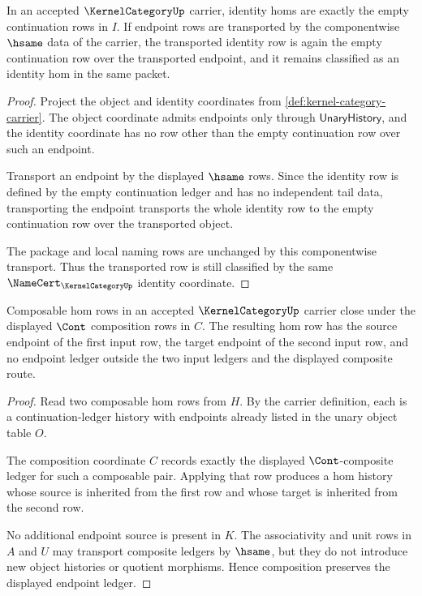 \begin{theorem}
\label{thm:kernel-category-identity-continuation}
In an accepted $\KernelCategoryUp$ carrier, identity homs are exactly the empty continuation rows in $I$. If endpoint rows are transported by the componentwise $\hsame$ data of the carrier, the transported identity row is again the empty continuation row over the transported endpoint, and it remains classified as an identity hom in the same packet.
\end{theorem}
\begin{proof}
Project the object and identity coordinates from \autoref{def:kernel-category-carrier}. The object coordinate admits endpoints only through $\mathsf{UnaryHistory}$, and the identity coordinate has no row other than the empty continuation row over such an endpoint.

Transport an endpoint by the displayed $\hsame$ rows. Since the identity row is defined by the empty continuation ledger and has no independent tail data, transporting the endpoint transports the whole identity row to the empty continuation row over the transported object.

The package and local naming rows are unchanged by this componentwise transport. Thus the transported row is still classified by the same $\NameCert_{\KernelCategoryUp}$ identity coordinate.
\end{proof}

\begin{theorem}
\label{thm:kernel-category-composition-continuation}
Composable hom rows in an accepted $\KernelCategoryUp$ carrier close under the displayed $\Cont$ composition rows in $C$. The resulting hom row has the source endpoint of the first input row, the target endpoint of the second input row, and no endpoint ledger outside the two input ledgers and the displayed composite route.
\end{theorem}
\begin{proof}
Read two composable hom rows from $H$. By the carrier definition, each is a continuation-ledger history with endpoints already listed in the unary object table $O$.

The composition coordinate $C$ records exactly the displayed $\Cont$-composite ledger for such a composable pair. Applying that row produces a hom history whose source is inherited from the first row and whose target is inherited from the second row.

No additional endpoint source is present in $K$. The associativity and unit rows in $A$ and $U$ may transport composite ledgers by $\hsame$, but they do not introduce new object histories or quotient morphisms. Hence composition preserves the displayed endpoint ledger.
\end{proof}

